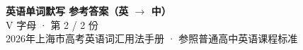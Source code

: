 \documentclass[10pt,a4paper]{article}
\begin{document}
\pagestyle{plain}

\begin{center}
{\LARGE\bfseries 英语单词默写 \quad 参考答案（英 $\to$ 中）}\\[0.22em]
{\large V 字母 · 第 2 / 2 份}\\[0.18em]
{\small 2026年上海市高考英语词汇用法手册 · 参照普通高中英语课程标准}
\end{center}

\vspace{0.2em}
\noindent{\color{rulegray}\rule{\textwidth}{0.8pt}}

\vspace{0.35em}

\vspace{0.25em}
\renewcommand{\arraystretch}{1.32}
\end{document}
